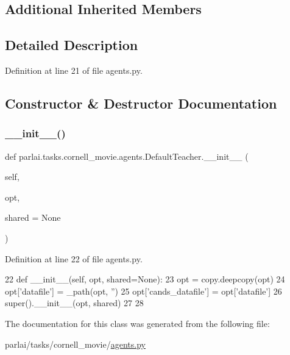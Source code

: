 \subsection*{Additional Inherited Members}


\subsection{Detailed Description}


Definition at line 21 of file agents.\+py.



\subsection{Constructor \& Destructor Documentation}
\mbox{\label{classparlai_1_1tasks_1_1cornell__movie_1_1agents_1_1DefaultTeacher_a0e6994f898313bb5117f56fc4ca78bb7}} 
\subsubsection{\texorpdfstring{\+\_\+\+\_\+init\+\_\+\+\_\+()}{\_\_init\_\_()}}
{\footnotesize\ttfamily def parlai.\+tasks.\+cornell\+\_\+movie.\+agents.\+Default\+Teacher.\+\_\+\+\_\+init\+\_\+\+\_\+ (\begin{DoxyParamCaption}\item[{}]{self,  }\item[{}]{opt,  }\item[{}]{shared = {\ttfamily None} }\end{DoxyParamCaption})}



Definition at line 22 of file agents.\+py.


\begin{DoxyCode}
22     \textcolor{keyword}{def }\_\_init\_\_(self, opt, shared=None):
23         opt = copy.deepcopy(opt)
24         opt[\textcolor{stringliteral}{'datafile'}] = \_path(opt, \textcolor{stringliteral}{''})
25         opt[\textcolor{stringliteral}{'cands\_datafile'}] = opt[\textcolor{stringliteral}{'datafile'}]
26         super().\_\_init\_\_(opt, shared)
27 
28 
\end{DoxyCode}


The documentation for this class was generated from the following file\+:\begin{DoxyCompactItemize}
\item 
parlai/tasks/cornell\+\_\+movie/\hyperlink{parlai_2tasks_2cornell__movie_2agents_8py}{agents.\+py}\end{DoxyCompactItemize}
